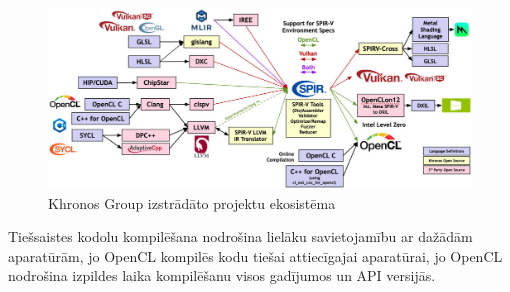 \begin{figure}[H]
    \centering
    \includegraphics[width=\textwidth]{images/2024-spirv-language-ecosystem.jpg}
    \caption{Khronos Group izstrādāto projektu ekosistēma\cite{spirv-ecosystem-image}}
    \label{img:khronos_ecosystem}
\end{figure}

Tiešsaistes kodolu kompilēšana nodrošina lielāku savietojamību ar dažādām
aparatūrām, jo OpenCL kompilēs kodu tiešai attiecīgajai aparatūrai, jo OpenCL
nodrošina izpildes laika kompilēšanu visos gadījumos un API versijās.
